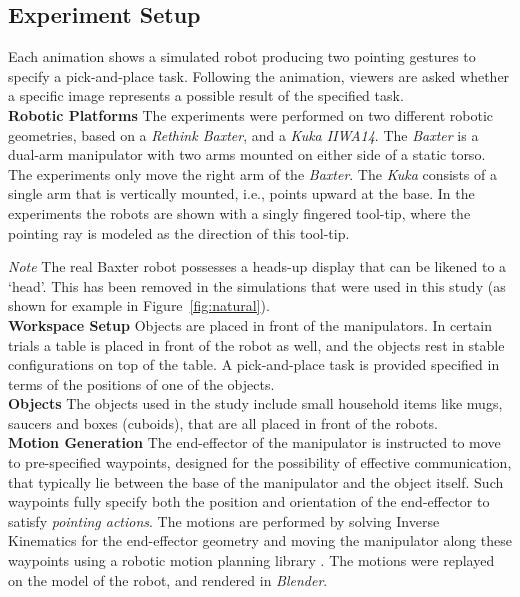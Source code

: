 \documentclass[letterpaper]{article} %
\begin{document}


\subsection{Experiment Setup}
Each animation shows a simulated robot producing two pointing gestures to specify a pick-and-place task.  Following the animation, viewers are asked whether a specific image represents a possible result of the specified task.\\

\noindent\textbf{Robotic Platforms} The experiments were performed on two different robotic geometries, based on a \textit{Rethink Baxter}, and a \textit{Kuka IIWA14}.  The \textit{Baxter} is a dual-arm manipulator with two arms mounted on either side of a static torso. The experiments only move the right arm of the \textit{Baxter}. The \textit{Kuka}  consists of a single arm that is vertically mounted, i.e., points upward at the base. In the experiments the robots are shown with a singly fingered tool-tip, where the pointing ray is modeled as the direction of this tool-tip.

\noindent\textit{Note} The real Baxter robot possesses a heads-up display that can be likened to a `head'. This has been removed in the simulations that were used in this study (as shown for example in Figure~\ref{fig:natural}).\\

\noindent\textbf{Workspace Setup} Objects are placed in front of the manipulators. In certain trials a table is placed in front of the robot as well, and the objects rest in stable configurations on top of the table. A pick-and-place task is provided specified in terms of the positions of one of the objects. \\

\noindent\textbf{Objects}  The objects used in the study include small household items like mugs, saucers and boxes (cuboids), that are all placed in front of the robots.\\

\noindent\textbf{Motion Generation}  The end-effector of the manipulator is instructed to move to pre-specified waypoints, designed for the possibility of effective communication, that typically lie between the base of the manipulator and the object itself. Such waypoints fully specify both the position and orientation of the end-effector to satisfy \textit{pointing actions}. The motions are performed by solving Inverse Kinematics for the end-effector geometry and moving the manipulator along these waypoints using a robotic motion planning library 
\cite{pracsys2014}.
The motions were replayed on the model of the robot, and rendered in \textit{Blender}.\\
\end{document}
